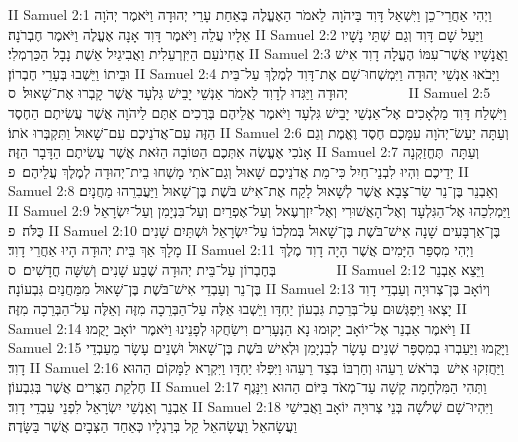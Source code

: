 II Samuel 2:1	וַיְהִי אַחֲרֵי־כֵן וַיִּשְׁאַל דָּוִד בַּיהֹוָה  לֵאמֹר הַאֶעֱלֶה בְּאַחַת עָרֵי יְהוּדָה וַיֹּאמֶר יְהֹוָה אֵלָיו עֲלֵה וַיֹּאמֶר דָּוִד אָנָה אֶעֱלֶה וַיֹּאמֶר חֶבְרֹנָה׃
II Samuel 2:2	וַיַּעַל שָׁם דָּוִד וְגַם שְׁתֵּי נָשָׁיו אֲחִינֹעַם הַיִּזְרְעֵלִית וַאֲבִיגַיִל אֵשֶׁת נָבָל הַכַּרְמְלִי׃
II Samuel 2:3	וַאֲנָשָׁיו אֲשֶׁר־עִמּוֹ הֶעֱלָה דָוִד אִישׁ וּבֵיתוֹ וַיֵּשְׁבוּ בְּעָרֵי חֶבְרוֹן׃
II Samuel 2:4	וַיָּבֹאוּ אַנְשֵׁי יְהוּדָה וַיִּמְשְׁחוּ־שָׁם אֶת־דָּוִד לְמֶלֶךְ עַל־בֵּית יְהוּדָה וַיַּגִּדוּ לְדָוִד לֵאמֹר אַנְשֵׁי יָבֵישׁ גִּלְעָד אֲשֶׁר קָבְרוּ אֶת־שָׁאוּל׃ {ס}        
II Samuel 2:5	וַיִּשְׁלַח דָּוִד מַלְאָכִים אֶל־אַנְשֵׁי יָבֵישׁ גִּלְעָד וַיֹּאמֶר אֲלֵיהֶם בְּרֻכִים אַתֶּם לַיהֹוָה אֲשֶׁר עֲשִׂיתֶם הַחֶסֶד הַזֶּה עִם־אֲדֹנֵיכֶם עִם־שָׁאוּל וַתִּקְבְּרוּ אֹתוֹ׃
II Samuel 2:6	וְעַתָּה יַעַשׂ־יְהֹוָה עִמָּכֶם חֶסֶד וֶאֱמֶת וְגַם אָנֹכִי אֶעֱשֶׂה אִתְּכֶם הַטּוֹבָה הַזֹּאת אֲשֶׁר עֲשִׂיתֶם הַדָּבָר הַזֶּה׃
II Samuel 2:7	וְעַתָּה  תֶּחֱזַקְנָה יְדֵיכֶם וִהְיוּ לִבְנֵי־חַיִל כִּי־מֵת אֲדֹנֵיכֶם שָׁאוּל וְגַם־אֹתִי מָשְׁחוּ בֵית־יְהוּדָה לְמֶלֶךְ עֲלֵיהֶם׃ {פ}
II Samuel 2:8	וְאַבְנֵר בֶּן־נֵר שַׂר־צָבָא אֲשֶׁר לְשָׁאוּל לָקַח אֶת־אִישׁ בֹּשֶׁת בֶּן־שָׁאוּל וַיַּעֲבִרֵהוּ מַחֲנָיִם׃
II Samuel 2:9	וַיַּמְלִכֵהוּ אֶל־הַגִּלְעָד וְאֶל־הָאֲשׁוּרִי וְאֶל־יִזְרְעֶאל וְעַל־אֶפְרַיִם וְעַל־בִּנְיָמִן וְעַל־יִשְׂרָאֵל כֻּלֹּה׃ {פ}
II Samuel 2:10	בֶּן־אַרְבָּעִים שָׁנָה אִישׁ־בֹּשֶׁת בֶּן־שָׁאוּל בְּמלְכוֹ עַל־יִשְׂרָאֵל וּשְׁתַּיִם שָׁנִים מָלָךְ אַךְ בֵּית יְהוּדָה הָיוּ אַחֲרֵי דָוִד׃
II Samuel 2:11	וַיְהִי מִסְפַּר הַיָּמִים אֲשֶׁר הָיָה דָוִד מֶלֶךְ בְּחֶבְרוֹן עַל־בֵּית יְהוּדָה שֶׁבַע שָׁנִים וְשִׁשָּׁה חֳדָשִׁים׃ {ס}        
II Samuel 2:12	וַיֵּצֵא אַבְנֵר בֶּן־נֵר וְעַבְדֵי אִישׁ־בֹּשֶׁת בֶּן־שָׁאוּל מִמַּחֲנַיִם גִּבְעוֹנָה׃
II Samuel 2:13	וְיוֹאָב בֶּן־צְרוּיָה וְעַבְדֵי דָוִד יָצְאוּ וַיִּפְגְּשׁוּם עַל־בְּרֵכַת גִּבְעוֹן יַחְדָּו וַיֵּשְׁבוּ אֵלֶּה עַל־הַבְּרֵכָה מִזֶּה וְאֵלֶּה עַל־הַבְּרֵכָה מִזֶּה׃
II Samuel 2:14	וַיֹּאמֶר אַבְנֵר אֶל־יוֹאָב יָקוּמוּ נָא הַנְּעָרִים וִישַׂחֲקוּ לְפָנֵינוּ וַיֹּאמֶר יוֹאָב יָקֻמוּ׃
II Samuel 2:15	וַיָּקֻמוּ וַיַּעַבְרוּ בְמִסְפָּר שְׁנֵים עָשָׂר לְבִנְיָמִן וּלְאִישׁ בֹּשֶׁת בֶּן־שָׁאוּל וּשְׁנֵים עָשָׂר מֵעַבְדֵי דָוִד׃
II Samuel 2:16	וַיַּחֲזִקוּ אִישׁ  בְּרֹאשׁ רֵעֵהוּ וְחַרְבּוֹ בְּצַד רֵעֵהוּ וַיִּפְּלוּ יַחְדָּו וַיִּקְרָא לַמָּקוֹם הַהוּא חֶלְקַת הַצֻּרִים אֲשֶׁר בְּגִבְעוֹן׃
II Samuel 2:17	וַתְּהִי הַמִּלְחָמָה קָשָׁה עַד־מְאֹד בַּיּוֹם הַהוּא וַיִּנָּגֶף אַבְנֵר וְאַנְשֵׁי יִשְׂרָאֵל לִפְנֵי עַבְדֵי דָוִד׃
II Samuel 2:18	וַיִּהְיוּ־שָׁם שְׁלֹשָׁה בְּנֵי צְרוּיָה יוֹאָב וַאֲבִישַׁי וַעֲשָׂהאֵל וַעֲשָׂהאֵל קַל בְּרַגְלָיו כְּאַחַד הַצְּבָיִם אֲשֶׁר בַּשָּׂדֶה׃
